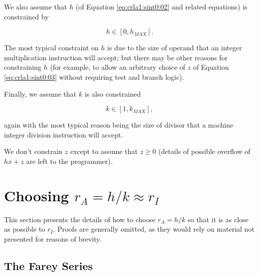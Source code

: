We also assume that $h$ (of Equation \ref{eq:crla1:sint0:02} and related
equations) is constrained by

\begin{equation}
\label{eq:crla1:snom0:02}
h \in [0, h_{MAX}] .
\end{equation}

\noindent{}The most typical constraint on $h$ is due to the size of operand
that an integer multiplication instruction will accept; but there may be other reasons
for constraining $h$ (for example, to allow an arbitrary choice of $z$ 
of Equation \ref{eq:crla1:sint0:03} without
requiring test and branch logic).

Finally, we assume that $k$ is also constrained

\begin{equation}
\label{eq:crla1:snom0:03}
k \in [1, k_{MAX}] ,
\end{equation}

\noindent{}again with the most typical reason being the size of divisor that 
a machine integer division instruction will accept.

We don't constrain $z$ except to assume that $z \geq 0$
(details of possible overflow of 
$hx+z$ are left to the programmer).



\section[Choosing $r_A = h/k \approx r_I$]
        {Choosing \mbox{\boldmath $r_A = h/k \approx r_I$}}

\label{crla1:slcr0}

This section presents the details of how to choose $r_A = h/k$ so that
it is as close as possible to $r_I$.  Proofs are generally omitted, as they
would rely on material not presented for reasons of brevity.



\subsection{The Farey Series}

